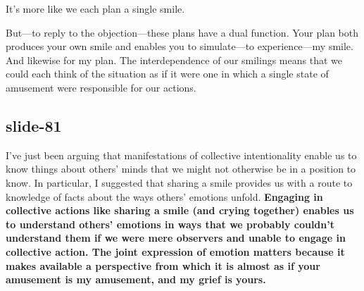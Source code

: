 \documentclass[12pt,\papersize]{extarticle}
\begin{document}
It's more like we each plan a single smile.

But---to reply to the objection---these plans have a dual function.
Your plan both produces your own smile and enables you to simulate---to experience---my smile.
And likewise for my plan.
The interdependence of our smilings means that we could each think of the situation as if it were one in which a single state of amusement were responsible for our actions.

\subsection{slide-81}
I've just been arguing that manifestations of collective intentionality enable us to know things about others' minds that we might not otherwise be in a position to know.
In particular, I suggested that
sharing a smile provides us with a route to knowledge of facts about the ways others' emotions unfold.
\textbf{
Engaging in collective actions like sharing a smile (and crying together) enables us to understand others’ emotions in ways that we probably couldn’t understand them if we were mere observers and unable to engage in collective action.
The joint expression of emotion matters because it makes available a perspective from which it is almost as if your amusement is my amusement, and my grief is yours.
}
 









\end{document}
